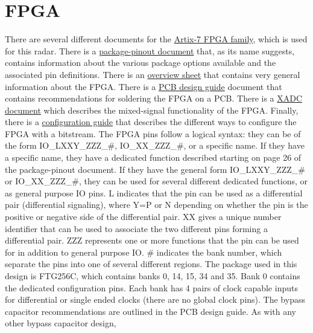 \section{FPGA}
There are several different documents for the
\href{https://www.xilinx.com/products/silicon-devices/fpga/artix-7.html?resultsTablePreSelect=documenttype:Data\%20Sheets#documentation}{Artix-7
  FPGA family}, which is used for this radar. There is a
\href{https://www.xilinx.com/support/documentation/user_guides/ug475_7Series_Pkg_Pinout.pdf}{package-pinout
  document} that, as its name suggests, contains information about the various package options
available and the associated pin definitions. There is an
\href{https://www.xilinx.com/support/documentation/data_sheets/ds180_7Series_Overview.pdf}{overview
  sheet} that contains very general information about the FPGA. There is a
\href{https://www.xilinx.com/support/documentation/user_guides/ug483_7Series_PCB.pdf}{PCB design
  guide} document that contains recommendations for soldering the FPGA on a PCB. There is a
\href{https://www.xilinx.com/support/documentation/user_guides/ug480_7Series_XADC.pdf}{XADC
  document} which describes the mixed-signal functionality of the FPGA. Finally, there is a
\href{https://www.xilinx.com/support/documentation/user_guides/ug470_7Series_Config.pdf}{configuration
  guide} that describes the different ways to configure the FPGA with a bitstream. The FPGA pins
follow a logical syntax: they can be of the form IO\_LXXY\_ZZZ\_\#, IO\_XX\_ZZZ\_\#, or a specific
name. If they have a specific name, they have a dedicated function described starting on page 26 of
the package-pinout document. If they have the general form IO\_LXXY\_ZZZ\_\# or IO\_XX\_ZZZ\_\#,
they can be used for several different dedicated functions, or as general purpose IO pins. L
indicates that the pin can be used as a differential pair (differential signaling), where Y=P or N
depending on whether the pin is the positive or negative side of the differential pair. XX gives a
unique number identifier that can be used to associate the two different pins forming a differential
pair. ZZZ represents one or more functions that the pin can be used for in addition to general
purpose IO. \# indicates the bank number, which separate the pins into one of several different
regions. The package used in this design is FTG256C, which contains banks 0, 14, 15, 34 and 35. Bank
0 contains the dedicated configuration pins. Each bank has 4 pairs of clock capable inputs for
differential or single ended clocks (there are no global clock pins). The bypass capacitor
recommendations are outlined in the PCB design guide. As with any other bypass capacitor design,
